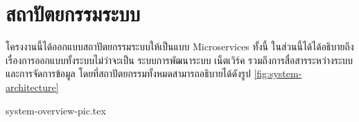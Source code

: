 \section{สถาปัตยกรรมระบบ}
โครงงานนี้ได้ออกแบบสถาปัตยกรรมระบบให้เป็นแบบ Microservices ทั้งนี้ ในส่วนนี้ได้ได้อธิบายถึงเรื่องการออกแบบทั้งระบบไม่ว่าจะเป็น ระบบการพัฒนาระบบ เน็ตเวิร์ค รวมถึงการสื่อสารระหว่างระบบ และการจัดการข้อมูล โดยที่สถาปัตยกรรมทั้งหมดสามารถอธิบายได้ดังรูป \ref{fig:system-architecture}

\clearpage
{system-overview-pic.tex}